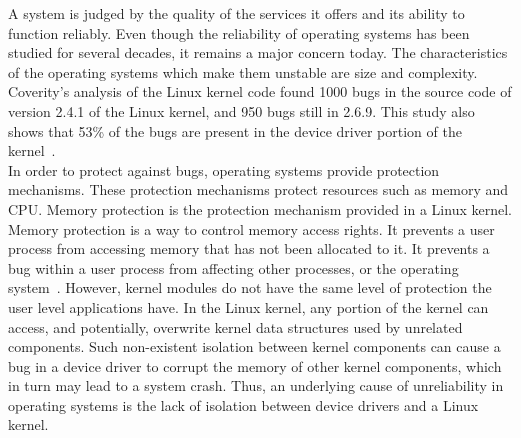 A system is judged by the quality of the services it offers and its ability to function reliably. Even though the reliability of operating systems has been studied for several decades, it remains a major concern today. The characteristics of the operating systems which make them unstable are size and complexity. 
\\[3mm]
Coverity's analysis of the Linux kernel code found 1000 bugs in the source code of version 2.4.1 of the Linux kernel, and 950 bugs still in 2.6.9. This study also shows that 53\% of the bugs are present in the device driver portion of the kernel~\cite{coveritykernel}. 
\\[3mm]
In order to protect against bugs, operating systems provide protection mechanisms. These protection mechanisms protect resources such as memory and CPU.
Memory protection is the protection mechanism provided in a Linux kernel. Memory protection is a way to control memory access rights. It prevents a user process from accessing memory that has not been allocated to it. It prevents a bug within a user process from affecting other processes, or the operating system~\cite{denning1970virtual, Galvin}. However, kernel modules do not have the same level of protection the user level applications have. In the Linux kernel, any portion of the kernel can access, and potentially, overwrite kernel data structures used by unrelated components. Such non-existent isolation between kernel components can cause a bug in a device driver to corrupt the memory of other kernel components, which in turn may lead to a system crash. Thus, an underlying cause of unreliability in operating systems is the lack of isolation between device drivers and a Linux kernel.

